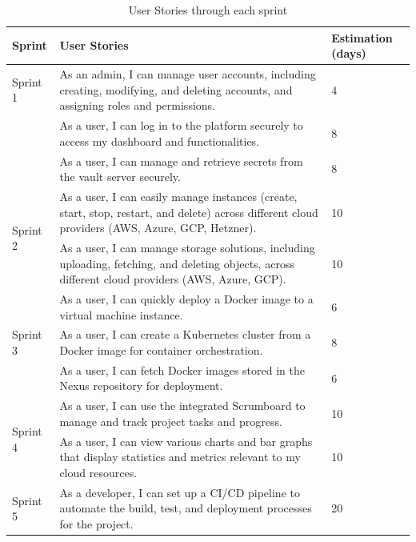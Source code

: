 \begin{table}[h!]
\centering
\caption{User Stories through each sprint}
\label{tab:sprints_backlog}
\begin{tabular}{|p{2cm}|p{10cm}|p{2cm}|}
\hline
\textbf{Sprint} & \textbf{User Stories} & \textbf{Estimation (days)} \\ \hline
Sprint 1 
& As an admin, I can manage user accounts, including creating, modifying, and deleting accounts, and assigning roles and permissions. & 4 \\ \cline{2-3}
& As a user, I can log in to the platform securely to access my dashboard and functionalities. & 8 \\ \cline{2-3}
& As a user, I can manage and retrieve secrets from the vault server securely. & 8  \\ \hline

\multirow{2}{*}{Sprint 2} 
& As a user, I can easily manage instances (create, start, stop, restart, and delete) across different cloud providers (AWS, Azure, GCP, Hetzner). & 10 \\ \cline{2-3}
& As a user, I can manage storage solutions, including uploading, fetching, and deleting objects, across different cloud providers (AWS, Azure, GCP). & 10 \\ \hline

\multirow{3}{*}{Sprint 3}
& As a user, I can quickly deploy a Docker image to a virtual machine instance. & 6 \\ \cline{2-3}
& As a user, I can create a Kubernetes cluster from a Docker image for container orchestration. & 8 \\ \cline{2-3}
& As a user, I can fetch Docker images stored in the Nexus repository for deployment. & 6 \\ \hline

\multirow{2}{*}{Sprint 4}
& As a user, I can use the integrated Scrumboard to manage and track project tasks and progress. & 10 \\ \cline{2-3}
& As a user, I can view various charts and bar graphs that display statistics and metrics relevant to my cloud resources. & 10  \\ \hline
\multirow{1}{*}{Sprint 5}
& As a developer, I can set up a CI/CD pipeline to automate the build, test, and deployment processes for the project. & 20  \\ \hline
\end{tabular}
\end{table}

